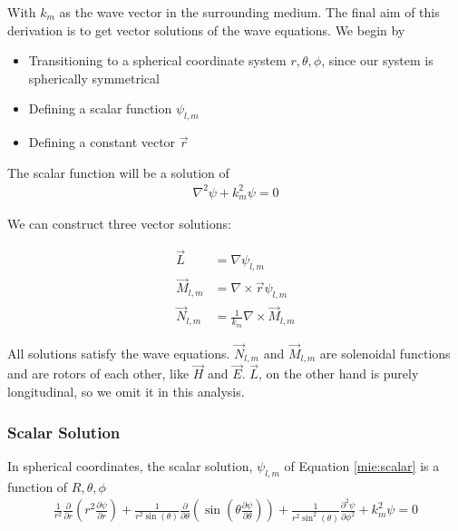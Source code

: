         With $k_m$ as the wave vector in the surrounding medium. The final aim of this derivation is to get vector solutions
        of the wave equations. We begin by
        \begin{itemize}
            \item Transitioning to a spherical coordinate system ${r, \theta, \phi}$, since our system is spherically symmetrical
            \item Defining a scalar function $\psi_{l,m}$
            \item Defining a constant vector $\vec{r}$
        \end{itemize}

        The scalar function will be a solution of
        \begin{align}
            \nabla^2\psi + k^2_m\psi = 0 \label{mie:scalar}
        \end{align}

        We can construct three vector solutions:

        \begin{align}
            \vec{L} &= \nabla\psi_{l,m} \\
            \vec{M}_{l,m} &= \nabla\times\vec{r}\psi_{l,m} \\
            \vec{N}_{l,m} &= \frac{1}{k_m}\nabla\times\vec{M}_{l,m}
        \end{align}

        All solutions satisfy the wave equations. $\vec{N}_{l,m}$ and $\vec{M}_{l,m}$ are solenoidal functions and are rotors of each other,
        like $\vec{H}$ and $\vec{E}$. $\vec{L}$, on the other hand is purely longitudinal, so we omit it in this analysis.

    \subsubsection{Scalar Solution}

        In spherical coordinates, the scalar solution, $\psi_{l,m}$ of Equation \ref{mie:scalar} is a function of ${R, \theta, \phi}$
        \begin{align}
            \frac{1}{r^2}\frac{\partial}{\partial r}\left(r^2\frac{\partial\psi}{\partial r}\right)
                + \frac{1}{r^2\sin(\theta)}\frac{\partial}{\partial\theta}\left(\sin(\theta\frac{\partial\psi}{\partial\theta})\right)
                + \frac{1}{r^2\sin^2(\theta)}\frac{\partial^2\psi}{\partial\phi^2} + k^2_m\psi = 0
        \end{align}

